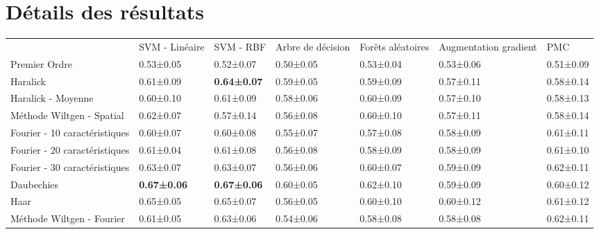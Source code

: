\chapter{Détails des résultats}
\vspace*{4cm}
\minitoc	
\newpage

\begin{landscape}
\begin{table}[]
\begin{tabular}{lllllll}
                              & SVM - Linéaire     & SVM - RBF          & Arbre de décision & Forêts aléatoires & Augmentation gradient & PMC       \\
Premier Ordre                 & 0.53±0.05          & 0.52±0.07          & 0.50±0.05         & 0.53±0.04         & 0.53±0.06             & 0.51±0.09 \\
\rowcolor[HTML]{E7E6E6} 
Haralick                      & 0.61±0.09          & \textbf{0.64±0.07} & 0.59±0.05         & 0.59±0.09         & 0.57±0.11             & 0.58±0.14 \\
Haralick - Moyenne            & 0.60±0.10          & 0.61±0.09          & 0.58±0.06         & 0.60±0.09         & 0.57±0.10             & 0.58±0.13 \\
Méthode Wiltgen - Spatial     & 0.62±0.07          & 0.57±0.14          & 0.56±0.08         & 0.60±0.10         & 0.57±0.11             & 0.58±0.14 \\
Fourier - 10 caractéristiques & 0.60±0.07          & 0.60±0.08          & 0.55±0.07         & 0.57±0.08         & 0.58±0.09             & 0.61±0.11 \\
Fourier - 20 caractéristiques & 0.61±0.04          & 0.61±0.08          & 0.56±0.08         & 0.58±0.09         & 0.58±0.09             & 0.61±0.10 \\
Fourier - 30 caractéristiques & 0.63±0.07          & 0.63±0.07          & 0.56±0.06         & 0.60±0.07         & 0.59±0.09             & 0.62±0.11 \\
\rowcolor[HTML]{E7E6E6} 
Daubechies     & \textbf{0.67±0.06} & \textbf{0.67±0.06} & 0.60±0.05         & 0.62±0.10         & 0.59±0.09             & 0.60±0.12 \\
Haar                    & 0.65±0.05          & 0.65±0.07          & 0.56±0.05         & 0.60±0.10         & 0.60±0.12             & 0.61±0.12 \\
Méthode Wiltgen - Fourier                          & 0.61±0.05          & 0.63±0.06          & 0.54±0.06         & 0.58±0.08         & 0.58±0.08             & 0.62±0.11 \\

\end{tabular}
\end{table}
\end{landscape}
